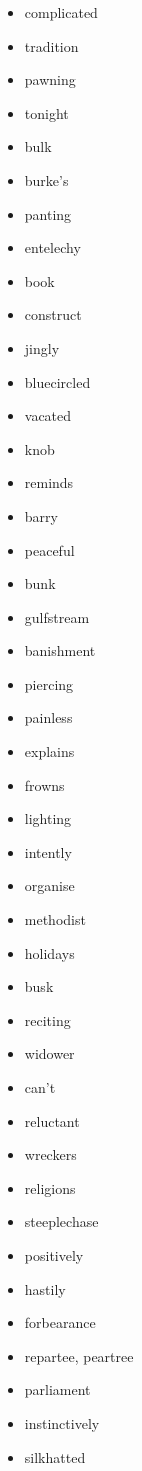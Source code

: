 \documentclass{article}
\begin{document}
\begin{itemize}
    \item complicated
    \item tradition
    \item pawning
    \item tonight
    \item bulk
    \item burke's
    \item panting
    \item entelechy
    \item book
    \item construct
    \item jingly
    \item bluecircled
    \item vacated
    \item knob
    \item reminds
    \item barry
    \item peaceful
    \item bunk
    \item gulfstream
    \item banishment
    \item piercing
    \item painless
    \item explains
    \item frowns
    \item lighting
    \item intently
    \item organise
    \item methodist
    \item holidays
    \item busk
    \item reciting
    \item widower
    \item can't
    \item reluctant
    \item wreckers
    \item religions
    \item steeplechase
    \item positively
    \item hastily
    \item forbearance
    \item repartee, peartree
    \item parliament
    \item instinctively
    \item silkhatted

\end{itemize}
\end{document}
